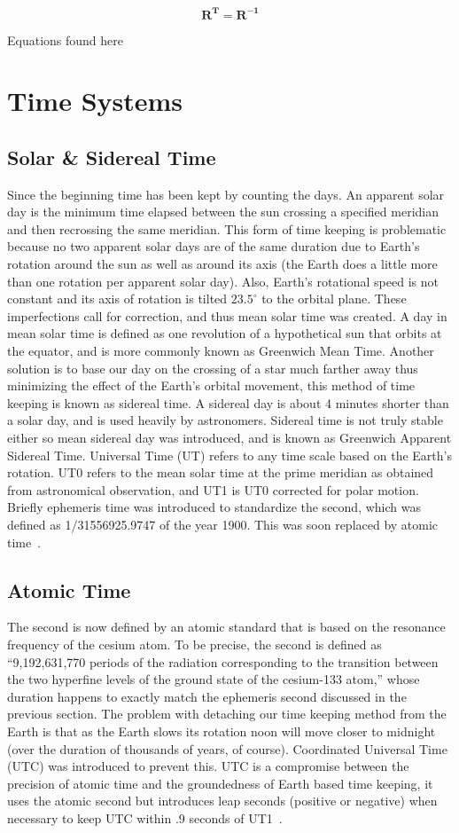 \[ \mathbf{R^{T}}=\mathbf{R^{-1}} \]

Equations found  here~\cite[pp. 81-82]{battin:imma}

\section{Time Systems}
\subsection{Solar \& Sidereal Time}
Since the  beginning time has been kept by counting the days. An apparent solar day is the minimum time elapsed between the sun crossing a specified meridian and then recrossing the same meridian. This form of time keeping is problematic because no two apparent solar days are of the same duration due to Earth's rotation around the sun as well as around its axis (the Earth does a little more than one rotation per apparent solar day). Also, Earth's rotational speed is not constant and its axis of rotation is tilted $23.5^{\circ}$ to the orbital plane. These imperfections call for correction, and thus mean solar time was created. A day in mean solar time is defined as one revolution of a hypothetical sun that orbits at the equator, and is more commonly known as Greenwich Mean Time. Another solution is to base our day on the crossing of a star much farther away thus minimizing the effect of the Earth's orbital movement, this method of time keeping is known as sidereal time. A sidereal day is about 4 minutes shorter than a solar day, and is used heavily by astronomers. Sidereal time is not truly stable either so mean sidereal day was introduced, and is known as Greenwich Apparent Sidereal Time. Universal Time (UT) refers to any time scale based on the Earth's rotation. UT0 refers to the mean solar time at the prime meridian as obtained from astronomical observation, and UT1 is UT0 corrected for polar motion. Briefly ephemeris time was introduced to standardize the second, which was defined as 1/31556925.9747 of the year 1900. This was soon replaced by atomic time~\cite[pp. 84-86]{me:gsmp}.
\subsection{Atomic Time}
The second is now defined by an atomic standard that is based on the resonance frequency of the cesium atom. To be precise, the second is defined as ``9,192,631,770 periods of the radiation corresponding to the transition between the two hyperfine levels of the ground state of the cesium-133 atom,'' whose duration happens to exactly match the ephemeris second discussed in the previous section. The problem with detaching our time keeping method from the Earth is that as the Earth slows its rotation noon will move closer to midnight (over the duration of thousands of years, of course). Coordinated Universal Time (UTC) was introduced to prevent this. UTC is a compromise between the precision of atomic time and the groundedness of Earth based time keeping, it uses the atomic second but introduces leap seconds (positive or negative) when necessary to keep UTC within .9 seconds of UT1~\cite[pp. 86-87]{me:gsmp}.
